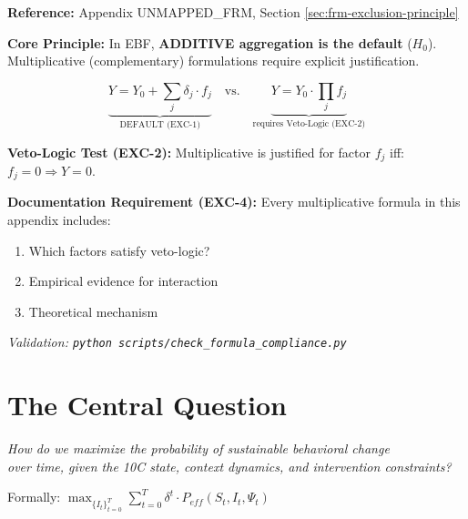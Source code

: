 \begin{tcolorbox}[colback=orange!5!white, colframe=orange!75!black,
    title=\textbf{Methodological Foundation: Exclusion Principle (EXC-1 to EXC-4)}]

\textbf{Reference:} Appendix UNMAPPED_FRM, Section \ref{sec:frm-exclusion-principle}

\textbf{Core Principle:} In EBF, \textbf{ADDITIVE aggregation is the default} ($H_0$). Multiplicative (complementary) formulations require explicit justification.

\begin{equation}
\boxed{
\underbrace{Y = Y_0 + \sum_j \delta_j \cdot f_j}_{\text{DEFAULT (EXC-1)}} \quad \text{vs.} \quad
\underbrace{Y = Y_0 \cdot \prod_j f_j}_{\text{requires Veto-Logic (EXC-2)}}
}
\end{equation}

\textbf{Veto-Logic Test (EXC-2):} Multiplicative is justified for factor $f_j$ iff: $f_j = 0 \Rightarrow Y = 0$.

\textbf{Documentation Requirement (EXC-4):} Every multiplicative formula in this appendix includes:
\begin{enumerate}[nosep]
    \item Which factors satisfy veto-logic?
    \item Empirical evidence for interaction
    \item Theoretical mechanism
\end{enumerate}

\textit{Validation: \texttt{python scripts/check\_formula\_compliance.py}}

\end{tcolorbox}

\section{The Central Question}
\label{sec:mp-central}

\begin{tcolorbox}[colback=red!5!white, colframe=red!75!black,
    title=\textbf{The Fundamental Question of EBF}]

\Large
\centering
\textit{How do we maximize the probability of sustainable behavioral change\\
over time, given the 10C state, context dynamics, and intervention constraints?}

\vspace{0.5em}
\normalsize
Formally: $\displaystyle\max_{\{I_t\}_{t=0}^T} \sum_{t=0}^{T} \delta^t \cdot P_{eff}(S_t, I_t, \Psi_t)$

\end{tcolorbox}

